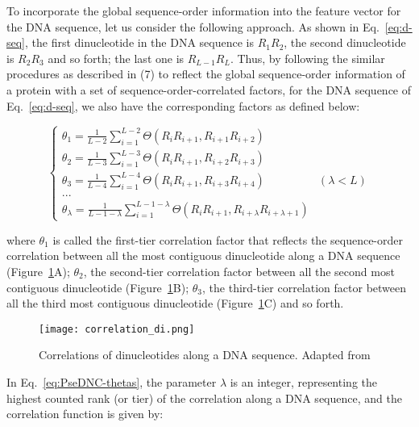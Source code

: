 To incorporate the global sequence-order information into the feature vector for the \gls{DNA} sequence, let us consider the following approach. As shown in Eq.~\ref{eq:d-seq}, the first dinucleotide in the \gls{DNA} sequence is $R_{1}R_{2}$, the second dinucleotide is $R_{2}R_{3}$ and so forth; the last one is $R_{L-1}R_{L}$. Thus, by following the similar procedures as described in (7) to reflect the global sequence-order information of a protein with a set of sequence-order-correlated factors, for the \gls{DNA} sequence of Eq.~\ref{eq:d-seq}, we also have the corresponding factors as defined below:

\begin{equation}\label{eq:PseDNC-thetas}
    \begin{cases}
    \theta_{1} = \frac{1}{L-2} \sum_{i=1}^{L-2}\Theta(R_{i}R_{i+1}, R_{i+1}R_{i+2})
    \\ 
    \theta_{2} = \frac{1}{L-3} \sum_{i=1}^{L-3}\Theta(R_{i}R_{i+1}, R_{i+2}R_{i+3})
    \\ 
    \theta_{3} = \frac{1}{L-4} \sum_{i=1}^{L-4}\Theta(R_{i}R_{i+1}, R_{i+3}R_{i+4}) & (\lambda < L)
    \\
    ...
    \\ 
    \theta_{\lambda} = \frac{1}{L-1-\lambda} \sum_{i=1}^{L-1-\lambda}\Theta(R_{i}R_{i+1}, R_{i+\lambda}R_{i+\lambda+1})
    \end{cases}
\end{equation}

where $\theta_{1}$ is called the first-tier correlation factor that reflects the sequence-order correlation between all the most contiguous dinucleotide along a DNA sequence (Figure~\ref{fig:psednc_correlation}A); $\theta_{2}$, the second-tier correlation factor between all the second most contiguous dinucleotide (Figure~\ref{fig:psednc_correlation}B); $\theta_{3}$, the third-tier correlation factor between all the third most contiguous dinucleotide (Figure~\ref{fig:psednc_correlation}C) and so forth.

\begin{figure}[htbp]
    \centering
    \texttt{[image: correlation\_di.png]}
    \caption{Correlations of dinucleotides along a DNA sequence. Adapted from~\cite{Chen2014PseKNC:Composition}}
    \label{fig:psednc_correlation}
\end{figure}


In Eq.~\ref{eq:PseDNC-thetas}, the parameter $\lambda$ is an integer, representing the highest counted rank (or tier) of the correlation along a DNA sequence, and the correlation function is given by:

